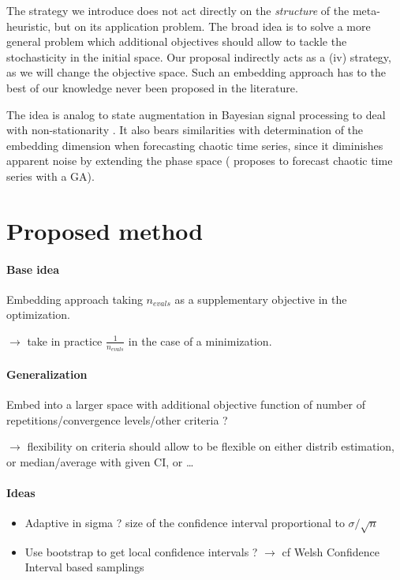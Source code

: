 The strategy we introduce does not act directly on the \emph{structure} of the meta-heuristic, but on its application problem. The broad idea is to solve a more general problem which additional objectives should allow to tackle the stochasticity in the initial space. Our proposal indirectly acts as a (iv) strategy, as we will change the objective space. Such an embedding approach has to the best of our knowledge never been proposed in the literature.

The idea is analog to state augmentation in Bayesian signal processing to deal with non-stationarity \cite{simon2006optimal}. It also bears similarities with determination of the embedding dimension when forecasting chaotic time series, since it diminishes apparent noise by extending the phase space (\cite{szpiro1997forecasting} proposes to forecast chaotic time series with a GA).

\section{Proposed method}

\paragraph{Base idea}

Embedding approach taking $n_{evals}$ as a supplementary objective in the optimization.

$\rightarrow$ take in practice $\frac{1}{n_{evals}}$ in the case of a minimization.

\paragraph{Generalization}


Embed into a larger space with additional objective function of number of repetitions/convergence levels/other criteria ?

$\rightarrow$ flexibility on criteria should allow to be flexible on either distrib estimation, or median/average with given CI, or \ldots



\paragraph{Ideas}

\begin{itemize}
\item Adaptive in sigma ? size of the confidence interval proportional to $\sigma / \sqrt{n}$
\item Use bootstrap to get local confidence intervals ? $\rightarrow$ cf Welsh Confidence Interval based samplings
\end{itemize}






